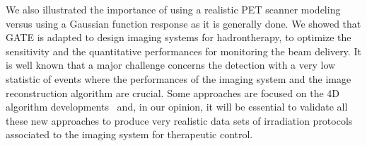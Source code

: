 \documentclass[11pt]{iopart}
\begin{document}
We also illustrated the importance of using a realistic PET scanner
modeling versus using a Gaussian function response as it is generally
done. We showed that GATE is adapted to design imaging systems for
hadrontherapy, to optimize the sensitivity and the quantitative
performances for monitoring the beam delivery. It is well known that a
major challenge concerns the detection with a very low statistic of
events where the performances of the imaging system and the image
reconstruction algorithm are crucial. Some approaches are focused on
the 4D algorithm developments~\cite{Fall2011} and, in our opinion, it
will be essential to validate all these new approaches to produce very
realistic data sets of irradiation protocols associated to the imaging
system for therapeutic control.



%
%

%
%

%

\end{document}
